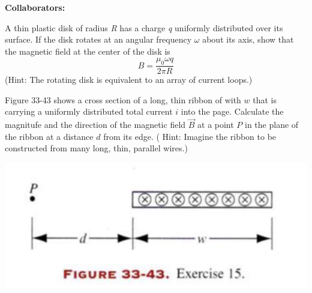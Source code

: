 \documentclass[11pt,letterpaper,boxed]{hmcpset}
\begin{document}
\noindent\textbf{Collaborators:} 


\begin{problem}[HRK P33.8]
A thin plastic disk of radius \textit{R} has a charge \textit{q} uniformly distributed over its surface. If the disk rotates at an angular frequency $\omega$ about its axis, show that the magnetic field at the center of the disk is
$$ B=\frac{\mu_0 \omega q}{2\pi R}$$
(Hint: The rotating disk is equivalent to an array of current loops.)
\end{problem}

\begin{solution}
\vfill
\end{solution}
\newpage

\begin{problem}[HRK 33.15]
Figure 33-43 shows a cross section of a long, thin ribbon of with $w$ that is carrying a uniformly distributed total current $i$ into the page. Calculate the magnitufe and the direction of the magnetic field $\vec{B}$ at a point $P$ in the plane of the ribbon at a distance $d$ from its edge. ( Hint: Imagine the ribbon to be constructed from many long, thin, parallel wires.) 
\begin{center}
\includegraphics[scale=0.6]{33-43.png}
\end{center}
\end{problem}

\begin{solution}
\vfill
\end{solution}
\newpage
\end{document}
